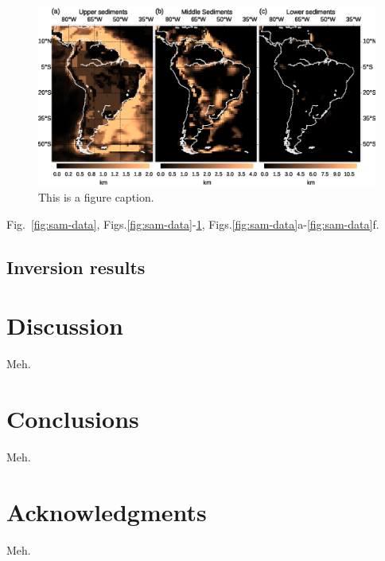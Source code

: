 \documentclass[extra]{gji}
\newcommand{\fig}[1]{Fig.~\ref{fig:#1}}
\newcommand{\figs}[2]{Figs.\ref{fig:#1}-\ref{fig:#2}}
\newcommand{\subfigs}[3]{Figs.\ref{fig:#1}#2-\ref{fig:#1}#3}
\begin{document}
\begin{figure}
    \centering
    \includegraphics[width=\textwidth]{figures/paper/sam-gravity-sed}
    \caption{This is a figure caption.}
    \label{fig:sam-sed}
\end{figure}

\fig{sam-data}, \figs{sam-data}{sam-sed}, \subfigs{sam-data}{a}{f}.

\subsection{Inversion results}

\section{Discussion}

Meh.

\section{Conclusions}

Meh.

\section{Acknowledgments}

Meh.



\end{document}
